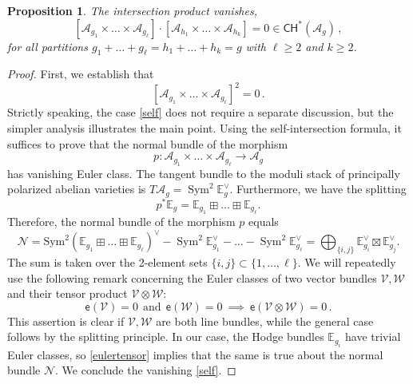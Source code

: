 \documentclass[11pt]{amsart}
\newtheorem{prop}[thm]{Proposition}
\theoremstyle{definition}
\newcommand{\A}{\mathcal{A}}
\newcommand{\CH}{\mathsf{CH}}
\DeclareMathOperator{\Sym}{Sym}
\begin{document}
{\begin{prop}\label{zeroint}
    The intersection product
    vanishes, \[
    [\A_{g_1}\times \ldots\times \A_{g_\ell}]\cdot [\A_{h_1}\times \ldots\times \A_{h_k}] = 0 \in \CH^*(\A_g)\, ,
    \]
for all partitions $g_1+\ldots+g_{\ell}=h_1+\ldots+h_k=g$ with $\ell\geq 2$ and  $k\geq 2$. 
\end{prop}
\begin{proof}
First, we establish that \begin{equation}\label{self}[\A_{g_1}\times \ldots\times \A_{g_\ell}]^2=0\, .\end{equation} Strictly speaking, the case \eqref{self} does not require a separate discussion, but the simpler analysis  illustrates the main point. Using the self-intersection formula, it suffices to prove that the normal bundle of the morphism $$p: \A_{g_1}\times \ldots\times \A_{g_\ell}\to \A_g$$ has vanishing Euler class. The tangent bundle to the moduli stack of principally polarized abelian varieties is $T\A_g=\Sym^2 \mathbb E^{\vee}_g.$ Furthermore, we have the splitting \begin{equation}\label{hodgespl}p^*\mathbb E_{g} = \mathbb E_{g_1} \boxplus \ldots \boxplus \mathbb E_{g_\ell}.\end{equation} Therefore, the normal bundle of the morphism $p$ equals \begin{equation}\label{normalbun}\mathcal N=\text{Sym}^2 (\mathbb E_{g_1} \boxplus \ldots \boxplus \mathbb E_{g_\ell})^{\vee}-\Sym^2\mathbb E_{g_1}^{\vee} -\ldots - \Sym^2 \mathbb E_{g_{\ell}}^{\vee}=\bigoplus_{\{i, j\}} \mathbb E_{g_i}^{\vee} \boxtimes \mathbb E_{g_j}^{\vee}.\end{equation} The sum is taken over the 2-element sets $\{i, j\}\subset \{1, \ldots, \ell\}.$ We will repeatedly use the following remark concerning the Euler classes of two vector bundles $\mathcal V , \mathcal W$ and their tensor product $\mathcal V\otimes \mathcal W$: \begin{equation}\label{eulertensor}\mathsf e(\mathcal V)=0 \ \ \text{and} \ \  \mathsf e(\mathcal W)=0\ \implies\ \mathsf e(\mathcal V\otimes \mathcal W)=0\, .\end{equation} This assertion is clear if $\mathcal V, \mathcal W$ are both line bundles, while the general case follows by the splitting principle. In our case, the Hodge bundles $\mathbb E_{g_i}$ have trivial Euler classes, so \eqref{eulertensor} implies that the same is true about the normal bundle $\mathcal N.$ We conclude the
vanishing  \eqref{self}. 


\end{proof}}
\end{document}
